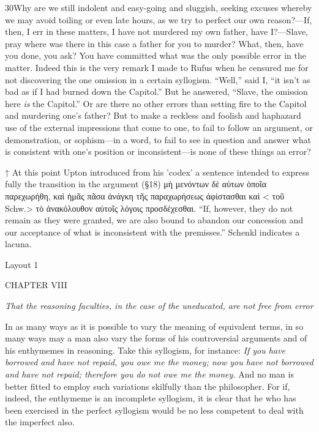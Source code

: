 30Why are we still indolent and easy-going and sluggish, seeking excuses whereby we may avoid toiling or even late hours, as we try to perfect our own reason?—If, then, I err in these matters, I have not murdered my own father, have I?—Slave, pray where was there in this case a father for you to murder? What, then, have you done, you ask? You have committed what was the only possible error in the matter. Indeed this is the very remark I made to Rufus when he censured me for not discovering the one omission in a certain syllogism. ``Well,'' said I, ``it isn't as bad as if I had burned down the Capitol.'' But he answered, ``Slave, the omission here \emph{is} the Capitol.'' Or are there no other errors than setting fire to the Capitol and murdering one's father? But to make a reckless and foolish and haphazard use of the external impressions that come to one, to fail to follow an argument, or demonstration, or sophism—in a word, to fail to see in question and answer what is consistent with one's position or inconsistent—is none of these things an error?



↑ At this point Upton introduced from his 'codex' a sentence intended to express fully the transition in the argument (§18) μὴ μενόντων δὲ αὐτων ὁποῖα παρεχωρήθη, καὶ ἡμᾶς πᾶσα ἀνάγκη τῆς παραχωρήσεως ἀφίστασθαι καὶ < τοῦ Schw.> τὸ ἀνακόλουθον αὐτοῖς λόγοις προσδέχεσθαι. ``If, however, they do not remain as they were granted, we are also bound to abandon our concession and our acceptance of what is inconsistent with the premisses.'' Schenkl indicates a lacuna.


Layout 1

CHAPTER VIII

\emph{That the reasoning faculties, in the case of the uneducated, are not free from error}

In as many ways as it is possible to vary the meaning of equivalent terms, in so many ways may a man also vary the forms of his controversial arguments and of his enthymemes in reasoning. Take this syllogism, for instance: \emph{If you have borrowed and have not repaid, you owe me the money; now you have not borrowed and have not repaid; therefore you do not owe me the money.} And no man is better fitted to employ such variations skilfully than the philosopher. For if, indeed, the enthymeme is an incomplete syllogism, it is clear that he who has been exercised in the perfect syllogism would be no less competent to deal with the imperfect also.

